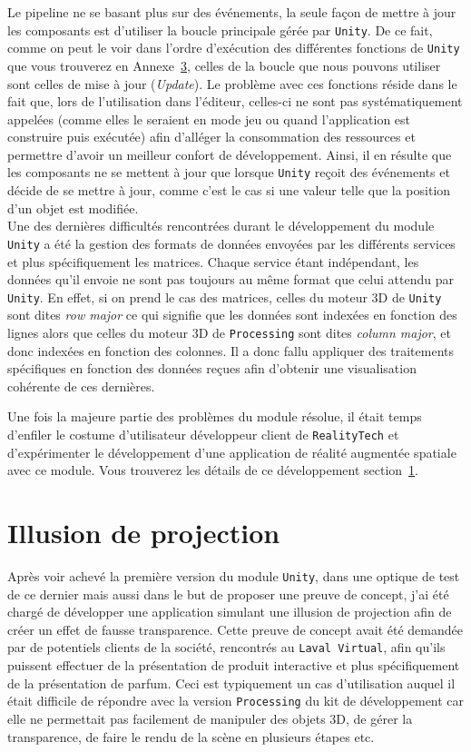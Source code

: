 Le pipeline ne se basant plus sur des événements, la seule façon de mettre à jour les composants est d'utiliser la boucle principale gérée par \texttt{Unity}. De ce fait, comme on peut le voir dans l'ordre d'exécution des différentes fonctions de \texttt{Unity} que vous trouverez en Annexe~\hyperref[annexe:unity]{3}, celles de la boucle que nous pouvons utiliser sont celles de mise à jour (\emph{Update}). Le problème avec ces fonctions réside dans le fait que, lors de l'utilisation dans l'éditeur, celles-ci ne sont pas systématiquement appelées (comme elles le seraient en mode jeu ou quand l'application est construire puis exécutée) afin d'alléger la consommation des ressources et permettre d'avoir un meilleur confort de développement. Ainsi, il en résulte que les composants ne se mettent à jour que lorsque \texttt{Unity} reçoit des événements et décide de se mettre à jour, comme c'est le cas si une valeur telle que la position d'un objet est modifiée.\\

Une des dernières difficultés rencontrées durant le développement du module \texttt{Unity} a été la gestion des formats de données envoyées par les différents services et plus spécifiquement les matrices. Chaque service étant indépendant, les données qu'il envoie ne sont pas toujours au même format que celui attendu par \texttt{Unity}. En effet, si on prend le cas des matrices, celles du moteur 3D de \texttt{Unity} sont dites \emph{row major} ce qui signifie que les données sont indexées en fonction des lignes alors que celles du moteur 3D de \texttt{Processing} sont dites \emph{column major}, et donc indexées en fonction des colonnes. Il a donc fallu appliquer des traitements spécifiques en fonction des données reçues afin d'obtenir une visualisation cohérente de ces dernières.

Une fois la majeure partie des problèmes du module résolue, il était temps d'enfiler le costume d'utilisateur développeur client de \texttt{RealityTech} et d'expérimenter le développement d'une application de réalité augmentée spatiale avec ce module. Vous trouverez les détails de ce développement section~\ref{sec:unity:appli}.

\section{Illusion de projection}
\label{sec:unity:appli}

Après voir achevé la première version du module \texttt{Unity}, dans une optique de test de ce dernier mais aussi dans le but de proposer une preuve de concept, j'ai été chargé de développer une application simulant une illusion de projection afin de créer un effet de fausse transparence. Cette preuve de concept avait été demandée par de potentiels clients de la société, rencontrés au \texttt{Laval Virtual}, afin qu'ils puissent effectuer de la présentation de produit interactive et plus spécifiquement de la présentation de parfum. Ceci est typiquement un cas d'utilisation auquel il était difficile de répondre avec la version \texttt{Processing} du kit de développement car elle ne permettait pas facilement de manipuler des objets 3D, de gérer la transparence, de faire le rendu de la scène en plusieurs étapes etc. 

